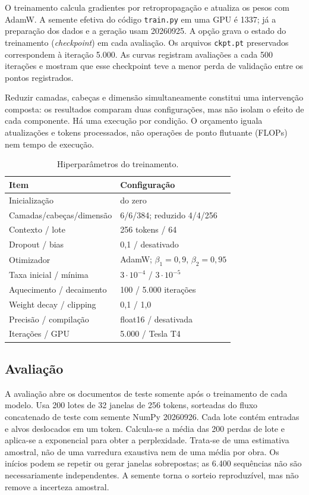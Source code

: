 \documentclass[conference]{IEEEtran}
\begin{document}
O treinamento calcula gradientes por retropropagação e atualiza os pesos com AdamW. A semente efetiva do código \texttt{train.py} em uma GPU é 1337; já a preparação dos dados e a geração usam 20260925. A opção  grava o estado do treinamento (\textit{checkpoint}) em cada avaliação. Os arquivos \texttt{ckpt.pt} preservados correspondem à iteração 5.000. As curvas registram avaliações a cada 500 iterações e mostram que esse checkpoint teve a menor perda de validação entre os pontos registrados.

Reduzir camadas, cabeças e dimensão simultaneamente constitui uma intervenção composta: os resultados comparam duas configurações, mas não isolam o efeito de cada componente. Há uma execução por condição. O orçamento iguala atualizações e tokens processados, não operações de ponto flutuante (FLOPs) nem tempo de execução.

\begin{table}[t]
\caption{Hiperparâmetros do treinamento.}
\label{tab:config}
\centering
\begin{tabular}{ll}
\toprule
Item & Configuração \\
\midrule
Inicialização & do zero \\
Camadas/cabeças/dimensão & 6/6/384; reduzido 4/4/256 \\
Contexto / lote & 256 tokens / 64 \\
Dropout / bias & 0,1 / desativado \\
Otimizador & AdamW; $\beta_1=0{,}9$, $\beta_2=0{,}95$ \\
Taxa inicial / mínima & $3\cdot10^{-4}$ / $3\cdot10^{-5}$ \\
Aquecimento / decaimento & 100 / 5.000 iterações \\
Weight decay / clipping & 0,1 / 1,0 \\
Precisão / compilação & float16 / desativada \\
Iterações / GPU & 5.000 / Tesla T4 \\
\bottomrule
\end{tabular}
\end{table}

\subsection{Avaliação}

A avaliação abre os documentos de teste somente após o treinamento de cada modelo. Usa 200 lotes de 32 janelas de 256 tokens, sorteadas do fluxo concatenado de teste com semente NumPy 20260926. Cada lote contém entradas e alvos deslocados em um token. Calcula-se a média das 200 perdas de lote e aplica-se a exponencial para obter a perplexidade. Trata-se de uma estimativa amostral, não de uma varredura exaustiva nem de uma média por obra. Os inícios podem se repetir ou gerar janelas sobrepostas; as 6.400 sequências não são necessariamente independentes. A semente torna o sorteio reproduzível, mas não remove a incerteza amostral.
\end{document}
